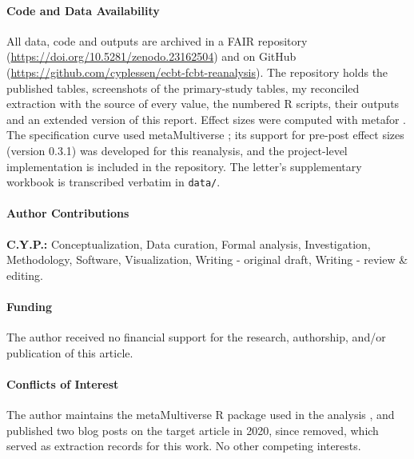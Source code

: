 \documentclass{JRR}
\begin{document}
\paragraph{Code and Data Availability}
All data, code and outputs are archived in a FAIR \cite{wilkinson2016fair} repository (\url{https://doi.org/10.5281/zenodo.23162504}) and on GitHub (\url{https://github.com/cyplessen/ecbt-fcbt-reanalysis}). The repository holds the published tables, screenshots of the primary-study tables, my reconciled extraction with the source of every value, the numbered R scripts, their outputs and an extended version of this report. Effect sizes were computed with metafor \cite{viechtbauer2010metafor}. The specification curve used metaMultiverse \cite{plessen2026metamultiverse}; its support for pre-post effect sizes (version 0.3.1) was developed for this reanalysis, and the project-level implementation is included in the repository. The letter's supplementary workbook is transcribed verbatim in \texttt{data/}.

\paragraph{Author Contributions}
\textbf{C.Y.P.:} Conceptualization, Data curation, Formal analysis, Investigation, Methodology, Software, Visualization, Writing - original draft, Writing - review \& editing.

\paragraph{Funding}
The author received no financial support for the research, authorship, and/or publication of this article.

\paragraph{Conflicts of Interest}
The author maintains the metaMultiverse R package used in the analysis \cite{plessen2026metamultiverse}, and published two blog posts on the target article in 2020, since removed, which served as extraction records for this work. No other competing interests.



\end{document}
